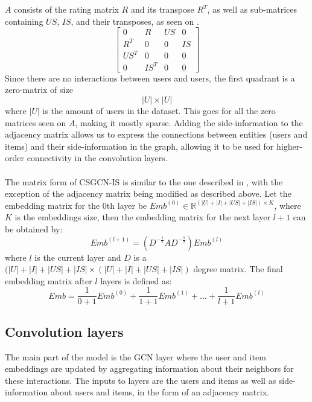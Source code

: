 $A$ consists of the rating matrix $R$ and its transpose $R^T$, as well as sub-matrices containing $US$, $IS$, and their transposes, as seen on .
\begin{equation}\label{csgcn_is_adj_mat}
    \begin{bmatrix}
    0 & R & US & 0\\
    R^T & 0 & 0 & IS\\
    US^T & 0 & 0 & 0 \\
    0 & IS^T & 0 & 0
    \end{bmatrix}
\end{equation}
Since there are no interactions between users and users, the first quadrant is a zero-matrix of size $$|U|\times|U|$$ where $|U|$ is the amount of users in the dataset.
This goes for all the zero matrices seen on $A$, making it mostly sparse.
Adding the side-information to the adjacency matrix allows us to express the connections between entities (users and items) and their side-information in the graph, allowing it to be used for higher-order connectivity in the convolution layers.
\\\\
The matrix form of CSGCN-IS is similar to the one described in \cite{LightGCN}, with the exception of the adjacency matrix being modified as described above.
Let the embedding matrix for the 0th layer be $Emb^{(0)} \in \mathbb{R}^{(|U| + |I| + |US| + |IS|) \times K}$, where $K$ is the embeddings size, then the embedding matrix for the next layer $l+1$ can be obtained by:
\begin{equation}
    Emb^{(l+1)} = (D^{-\frac{1}{2}}AD^{-\frac{1}{2}})Emb^{(l)}
\end{equation}
where $l$ is the current layer and $D$ is a $(|U| + |I| + |US| + |IS| \times (|U| + |I| + |US| + |IS|)$ degree matrix. 
The final embedding matrix after $l$ layers is defined as:
\begin{equation}
    Emb = \frac{1}{0 +1}Emb^{(0)} + \frac{1}{1 +1}Emb^{(1)} + ... + \frac{1}{l +1}Emb^{(l)}
\end{equation}


\subsection{Convolution layers}\label{subsec:csgcn_is_conv_layer}
The main part of the model is the GCN layer where the user and item embeddings are updated by aggregating information about their neighbors for these interactions.
The inputs to layers are the users and items as well as side-information about users and items, in the form of an adjacency matrix.

